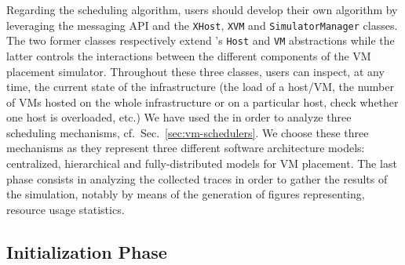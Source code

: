 Regarding the scheduling algorithm, users should develop their own
algorithm by leveraging the \sg messaging API and the \texttt{XHost},
\texttt{XVM} and \texttt{SimulatorManager} classes. The two former
classes respectively extend \sg's \texttt{Host} and \texttt{VM}
abstractions while the latter controls the interactions between the
different components of the VM placement simulator.  Throughout these
three classes, users can inspect, at any time, the current state of
the infrastructure (\ie the load of a host/VM, the number of VMs
hosted on the whole infrastructure or on a particular host, check
whether one host is overloaded, etc.) We have used the \vmps in order
to analyze three scheduling mechanisms, cf.\
Sec.~\ref{sec:vm-schedulers}. We choose these three mechanisms as they
represent three different software architecture models: centralized,
hierarchical and fully-distributed models for VM placement.
The last phase consists in analyzing the collected traces in order to
gather the results of the simulation, notably by means of the
generation of figures representing, \eg resource usage statistics.


\subsection{Initialization Phase}

